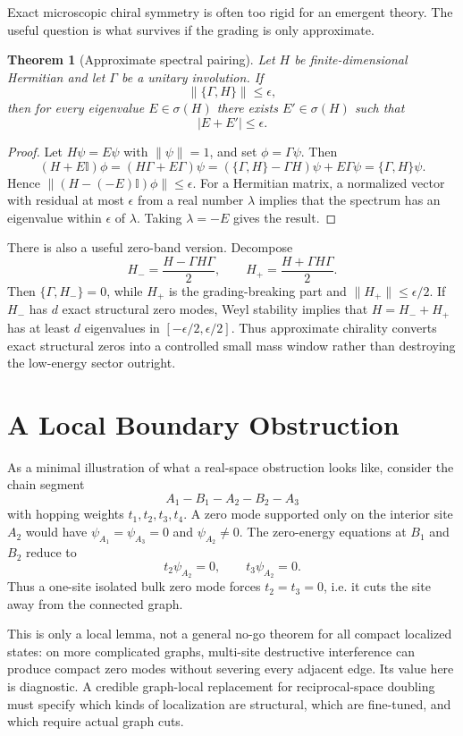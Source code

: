 \documentclass[11pt,a4paper]{article}
\newtheorem{theorem}{Theorem}
\newcommand{\bbI}{\mathbb{I}}
\begin{document}
Exact microscopic chiral symmetry is often too rigid for an emergent theory.
The useful question is what survives if the grading is only approximate.

\begin{theorem}[Approximate spectral pairing]
Let $H$ be finite-dimensional Hermitian and let $\Gamma$ be a unitary
involution. If
\[
  \|\{\Gamma,H\}\|\leq \epsilon,
\]
then for every eigenvalue $E\in\sigma(H)$ there exists
$E'\in\sigma(H)$ such that
\[
  |E+E'|\leq \epsilon.
\]
\end{theorem}

\begin{proof}
Let $H\psi=E\psi$ with $\|\psi\|=1$, and set $\phi=\Gamma\psi$. Then
\[
  (H+E\bbI)\phi
  = (H\Gamma+E\Gamma)\psi
  = (\{\Gamma,H\}-\Gamma H)\psi+E\Gamma\psi
  = \{\Gamma,H\}\psi.
\]
Hence $\|(H-(-E)\bbI)\phi\|\leq \epsilon$. For a Hermitian matrix, a
normalized vector with residual at most $\epsilon$ from a real number
$\lambda$ implies that the spectrum has an eigenvalue within $\epsilon$ of
$\lambda$. Taking $\lambda=-E$ gives the result.
\end{proof}

There is also a useful zero-band version. Decompose
\[
  H_{-}=\frac{H-\Gamma H\Gamma}{2},\qquad
  H_{+}=\frac{H+\Gamma H\Gamma}{2}.
\]
Then $\{\Gamma,H_-\}=0$, while $H_+$ is the grading-breaking part and
$\|H_+\|\leq \epsilon/2$. If $H_-$ has $d$ exact structural zero modes, Weyl
stability implies that $H=H_-+H_+$ has at least $d$ eigenvalues in
$[-\epsilon/2,\epsilon/2]$. Thus approximate chirality converts exact
structural zeros into a controlled small mass window rather than destroying
the low-energy sector outright.

\section{A Local Boundary Obstruction}

As a minimal illustration of what a real-space obstruction looks like, consider
the chain segment
\[
  A_1 - B_1 - A_2 - B_2 - A_3
\]
with hopping weights $t_1,t_2,t_3,t_4$. A zero mode supported only on the
interior site $A_2$ would have $\psi_{A_1}=\psi_{A_3}=0$ and
$\psi_{A_2}\neq0$. The zero-energy equations at $B_1$ and $B_2$ reduce to
\[
  t_2\psi_{A_2}=0,\qquad t_3\psi_{A_2}=0.
\]
Thus a one-site isolated bulk zero mode forces $t_2=t_3=0$, i.e. it cuts the
site away from the connected graph.

This is only a local lemma, not a general no-go theorem for all compact
localized states: on more complicated graphs, multi-site destructive
interference can produce compact zero modes without severing every adjacent
edge. Its value here is diagnostic. A credible graph-local replacement for
reciprocal-space doubling must specify which kinds of localization are
structural, which are fine-tuned, and which require actual graph cuts.
\end{document}
